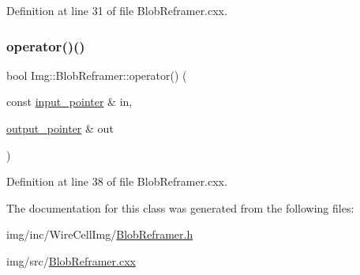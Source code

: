 Definition at line 31 of file Blob\+Reframer.\+cxx.

\mbox{\label{class_wire_cell_1_1_img_1_1_blob_reframer_acafad20831aee70abbcd8acb310c4bf2}} 
\subsubsection{\texorpdfstring{operator()()}{operator()()}}
{\footnotesize\ttfamily bool Img\+::\+Blob\+Reframer\+::operator() (\begin{DoxyParamCaption}\item[{const \hyperlink{class_wire_cell_1_1_i_function_node_a55c0946156df9b712b8ad1a0b59b2db6}{input\+\_\+pointer} \&}]{in,  }\item[{\hyperlink{class_wire_cell_1_1_i_function_node_afc02f1ec60d31aacddf64963f9ca650b}{output\+\_\+pointer} \&}]{out }\end{DoxyParamCaption})\hspace{0.3cm}{\ttfamily [virtual]}}



Definition at line 38 of file Blob\+Reframer.\+cxx.



The documentation for this class was generated from the following files\+:\begin{DoxyCompactItemize}
\item 
img/inc/\+Wire\+Cell\+Img/\hyperlink{_blob_reframer_8h}{Blob\+Reframer.\+h}\item 
img/src/\hyperlink{_blob_reframer_8cxx}{Blob\+Reframer.\+cxx}\end{DoxyCompactItemize}
